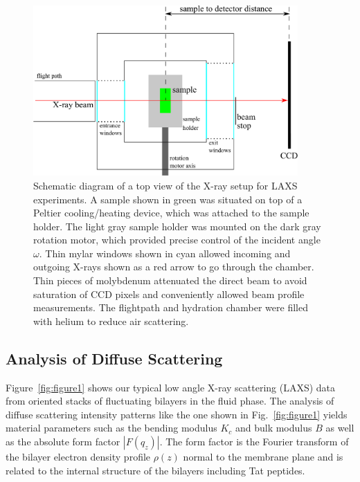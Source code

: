 \begin{figure}[htbp]
  \centering
  \includegraphics[width=0.9\textwidth]{figures/Tat/MMs/chamber_geometry}
  \caption[Schematic diagram of the X-ray setup for LAXS experiments.]
  {Schematic diagram of a top view of the X-ray setup for LAXS experiments.
  A sample shown in green was situated on top of a Peltier cooling/heating
  device, which was attached to the sample holder. The light gray 
  sample holder was mounted on the dark gray rotation motor, which provided 
  precise control of the incident angle $\omega$. Thin mylar windows shown 
  in cyan allowed incoming
  and outgoing X-rays shown as a red arrow to go through the chamber.
  Thin pieces of molybdenum attenuated
  the direct beam to avoid saturation of CCD pixels and conveniently allowed 
  beam profile measurements. The flightpath and hydration chamber
  were filled with helium to reduce air scattering.}
  \label{fig:x-ray_setup}
\end{figure}

\subsection{Analysis of Diffuse Scattering}\label{sec:diffuse_analysis}
Figure~\ref{fig:figure1} shows our typical low angle X-ray scattering (LAXS) data 
from oriented stacks of fluctuating bilayers in the fluid phase. 
The analysis of diffuse scattering 
intensity patterns like the one shown in Fig.~\ref{fig:figure1} yields material 
parameters such as the bending modulus $K_c$ and bulk modulus $B$ as well as
the absolute form factor $|F(q_z)|$. 
The form factor is the Fourier transform of the bilayer electron 
density profile $\rho(z)$ normal to the membrane plane 
and is related to the internal structure of the
bilayers including Tat peptides.

